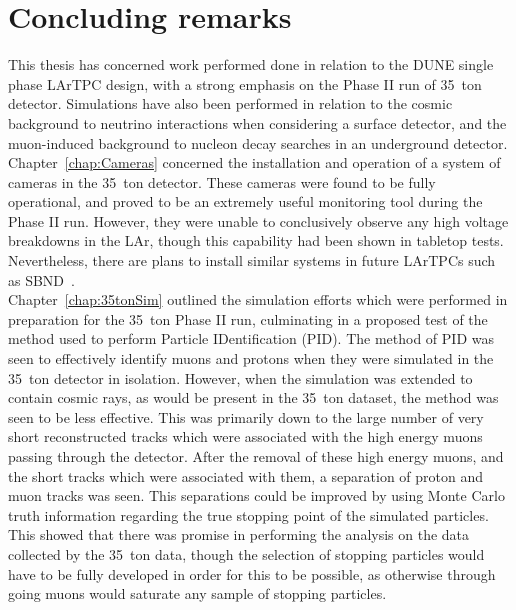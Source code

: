 \chapter{Concluding remarks} \label{chap:Conc} %

\graphicspath{{35tonData/Figs/PDF/}{35tonData/Figs/Raster/}{35tonData/Figs/Vector/}}

This thesis has concerned work performed done in relation to the DUNE single phase LArTPC design, with a strong emphasis on the Phase II run of 35~ton detector. Simulations have also been performed in relation to the cosmic background to neutrino interactions when considering a surface detector, and the muon-induced background to nucleon decay searches in an underground detector. \\

Chapter~\ref{chap:Cameras} concerned the installation and operation of a system of cameras in the 35~ton detector. These cameras were found to be fully operational, and proved to be an extremely useful monitoring tool during the Phase II run. However, they were unable to conclusively observe any high voltage breakdowns in the LAr, though this capability had been shown in tabletop tests. Nevertheless, there are plans to install similar systems in future LArTPCs such as SBND~\citep{SBNProposal}. \\

Chapter~\ref{chap:35tonSim} outlined the simulation efforts which were performed in preparation for the 35~ton Phase II run, culminating in a proposed test of the method used to perform Particle IDentification (PID). The method of PID was seen to effectively identify muons and protons when they were simulated in the 35~ton detector in isolation. However, when the simulation was extended to contain cosmic rays, as would be present in the 35~ton dataset, the method was seen to be less effective. This was primarily down to the large number of very short reconstructed tracks which were associated with the high energy muons passing through the detector. After the removal of these high energy muons, and the short tracks which were associated with them, a separation of proton and muon tracks was seen. This separations could be improved by using Monte Carlo truth information regarding the true stopping point of the simulated particles. This showed that there was promise in performing the analysis on the data collected by the 35~ton data, though the selection of stopping particles would have to be fully developed in order for this to be possible, as otherwise through going muons would saturate any sample of stopping particles. \\

